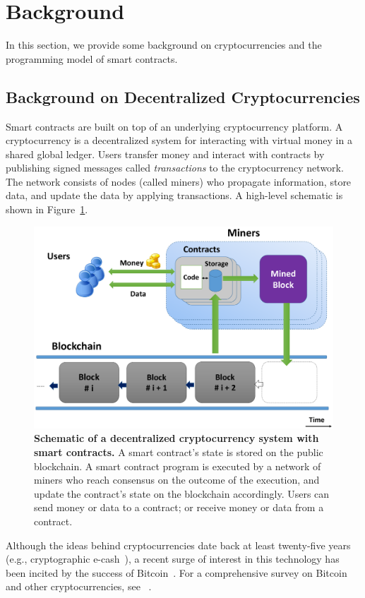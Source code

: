 \documentclass{llncs}
\begin{document}
\section{Background}
\label{sec:Background}
In this section, we provide some background on cryptocurrencies and the programming model of smart contracts.

\subsection{Background on Decentralized Cryptocurrencies}
Smart contracts are built on top of an underlying cryptocurrency platform. A cryptocurrency is a decentralized system for interacting with virtual money in a shared global ledger. Users transfer money and interact with contracts by publishing signed messages called \emph{transactions} to the cryptocurrency network. The network consists of nodes (called miners) who propagate information, store data, and update the data by applying transactions. A high-level schematic is shown in Figure~\ref{fig:schematic}.
\begin{figure}[t]
\centering
\includegraphics[width=0.7\columnwidth]{overview_figure}
\caption{{\bf Schematic of a decentralized cryptocurrency system 
with smart contracts.}
A smart contract's state is stored on the public blockchain.
A smart contract program is executed by a 
network of miners who reach consensus on the
outcome of the execution, and update the contract's state 
on the blockchain accordingly.
Users can send money or data to a contract;
or receive money or data from a contract.
}
\label{fig:schematic}
\end{figure}

Although the ideas behind cryptocurrencies date back at least twenty-five years (e.g., cryptographic e-cash~\cite{chaum-ecash}), a recent surge of interest in this technology has been incited by the success of Bitcoin~\cite{bitcoin}. For a comprehensive survey on Bitcoin and other cryptocurrencies, see ~\cite{researchperspectives,bittertobetter}.
\end{document}
